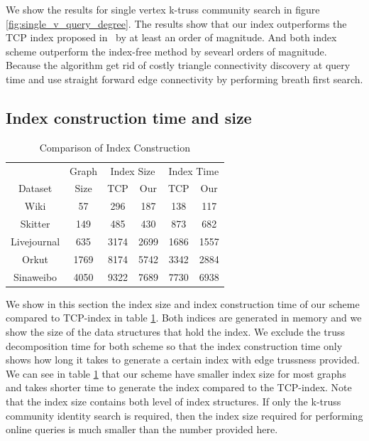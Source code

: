We show the results for single vertex k-truss community search in figure \ref{fig:single_v_query_degree}. The results show that our index outperforms the TCP index proposed in~\cite{huang2014querying} by at least an order of magnitude. And both index scheme outperform the index-free method by sevearl orders of magnitude. Because the algorithm get rid of costly triangle connectivity discovery at query time and use straight forward edge connectivity by performing breath first search. 
 
\subsection{Index construction time and size}
\label{eval_const}

\begin{table}
		\caption{Comparison of Index Construction}
		\vspace{2 mm}
		\label{table:index_construction}
		\centering
		\begin{tabular}{|c|c|cc|cc|} \hline 
			 & Graph & \multicolumn{2}{|c|}{Index Size} & \multicolumn{2}{|c}{Index Time} \\
			\cline{3-6}
			Dataset & Size & TCP  & Our & TCP & Our \\ \hline
			Wiki & 57 & 296 & 187 & 138 & 117\\ 
			Skitter & 149 & 485 & 430 & 873 & 682\\ 
			Livejournal & 635 & 3174 & 2699 & 1686 & 1557\\ 
			Orkut & 1769 & 8174 & 5742 & 3342 & 2884\\ 
			Sinaweibo & 4050 & 9322 & 7689 & 7730 & 6938 \\ \hline
		\end{tabular}
\end{table}

We show in this section the index size and index construction time of our scheme compared to TCP-index in 
table \ref{table:index_construction}. Both indices are generated in memory and we show the size of the data structures that hold the index. We exclude the truss decomposition time for both scheme so that the index construction time only shows how long it takes to generate a certain index with edge trussness provided.  We can see in table \ref{table:index_construction} that our scheme have smaller index size for most graphs and takes shorter time to generate the index compared to the TCP-index. Note that the index size contains both level of index structures. If only the k-truss community identity search is required, then the index size required for performing online queries is much smaller than the number provided here.

%


